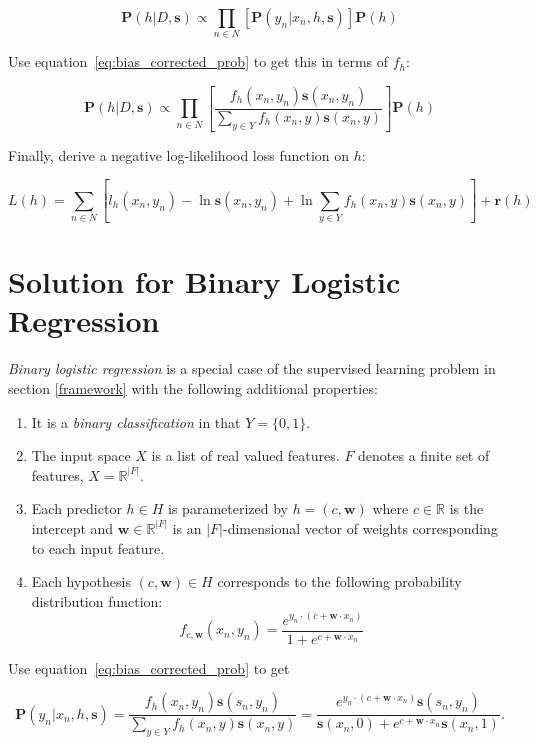 \documentclass[twoside]{article}
\begin{document}
\[\mathbf{P}(h|D,\mathbf{s})\propto\prod_{n \in N} \left[\mathbf{P}(y_n|x_n,h,\mathbf{s})\right]\mathbf{P}(h)\]

Use equation~\eqref{eq:bias_corrected_prob} to get this in terms of \(f_h\):

\[\mathbf{P}(h|D,\mathbf{s})\propto\prod_{n \in N} \left[\frac{f_h(x_n,y_n)\mathbf{s}(x_n,y_n)}{\sum_{y \in Y}f_h(x_n,y)\mathbf{s}(x_n,y)}\right]\mathbf{P}(h)\]

Finally, derive a negative log-likelihood loss function on \(h\):

\[L(h)= \sum_{n \in N} \left[l_h(x_n,y_n)-\ln\mathbf{s}(x_n,y_n)+\ln\sum_{y \in Y}f_h(x_n,y)\mathbf{s}(x_n,y) \right] +\mathbf{r}(h)\]

\section{Solution for Binary Logistic Regression}
\label{section:logistic}

\textit{Binary logistic regression} is a special case of the supervised learning problem in section \ref{framework} with the following additional properties:

\begin{enumerate}
	\item It is a \textit{binary classification} in that \(Y = \{0, 1\}\).
	\item The input space \(X\) is a list of real valued features. \(F\) denotes a finite set of features, \(X = \mathbb{R} ^{|F|}\).
	\item Each predictor \(h \in H\) is parameterized by \(h = (c, \mathbf{w})\) where \(c \in \mathbb{R}\) is the intercept and \(\mathbf{w} \in \mathbb{R}^{|F|}\) is an \(|F|\)-dimensional vector of weights corresponding to each input feature.
          \item Each hypothesis \((c, \mathbf{w}) \in H\) corresponds to the following probability distribution function:
          \[f_{c,\mathbf{w}}(x_n, y_n)=\frac{e^{y_n \cdot (c+\mathbf{w} \cdot x_n)}}{1+e^{c+\mathbf{w} \cdot x_n}}\]
\end{enumerate}

Use equation~\eqref{eq:bias_corrected_prob} to get

\[\mathbf{P}(y_n|x_n,h,\mathbf{s})=\frac{f_h(x_n,y_n)\mathbf{s}(s_n,y_n)}{\sum_{y \in Y}f_h(x_n,y)\mathbf{s}(x_n,y)}=\frac{e^{y_n \cdot (c+\mathbf{w} \cdot x_n)}\mathbf{s}(s_n,y_n)}{\mathbf{s}(x_n,0)+e^{c+\mathbf{w} \cdot x_n}\mathbf{s}(x_n,1)}.\]
\end{document}

